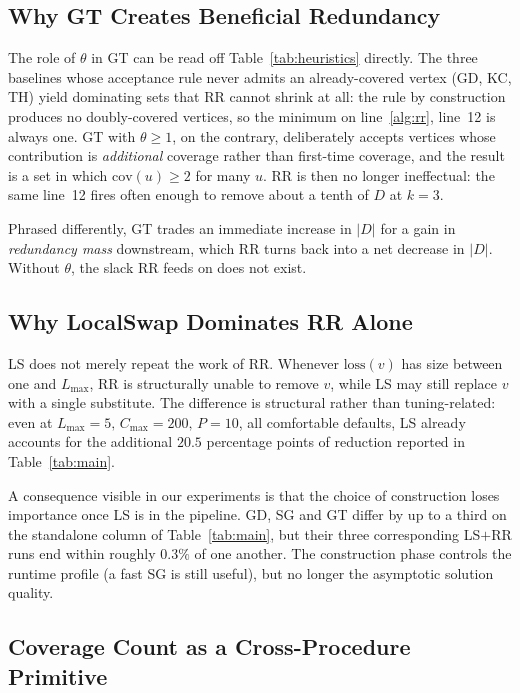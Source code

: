\documentclass[11pt,a4paper]{article}
\newcommand{\cov}{\mathrm{cov}}
\newcommand{\loss}{\mathrm{loss}}
\begin{document}
\subsection{Why GT Creates Beneficial Redundancy}

The role of $\theta$ in GT can be read off
Table~\ref{tab:heuristics} directly. The three baselines whose
acceptance rule never admits an already-covered vertex (GD, KC, TH)
yield dominating sets that RR cannot shrink at all: the rule by
construction produces no doubly-covered vertices, so the minimum on
line~\ref{alg:rr}, line~12 is always one. GT with $\theta\ge 1$, on
the contrary, deliberately accepts vertices whose contribution is
\emph{additional} coverage rather than first-time coverage, and the
result is a set in which $\cov(u)\ge 2$ for many $u$. RR is then no
longer ineffectual: the same line~12 fires often enough to remove
about a tenth of $D$ at $k=3$.

Phrased differently, GT trades an immediate increase in $|D|$ for a
gain in \emph{redundancy mass} downstream, which RR turns back into a
net decrease in $|D|$. Without $\theta$, the slack RR feeds on does
not exist.


\subsection{Why LocalSwap Dominates RR Alone}
\label{sec:discussion:why-ls}

LS does not merely repeat the work of RR. Whenever
$\loss(v)$ has size between one and $L_{\max}$, RR is structurally
unable to remove $v$, while LS may still replace $v$ with a single
substitute. The difference is structural rather than tuning-related:
even at $L_{\max}=5,\,C_{\max}=200,\,P=10$, all comfortable defaults,
LS already accounts for the additional $20.5$ percentage points of
reduction reported in Table~\ref{tab:main}.

A consequence visible in our experiments is that the choice of
construction loses importance once LS is in the pipeline. GD, SG and
GT differ by up to a third on the standalone column of
Table~\ref{tab:main}, but their three corresponding LS$+$RR runs end
within roughly $0.3\%$ of one another. The construction phase
controls the runtime profile (a fast SG is still useful), but no
longer the asymptotic solution quality.


\subsection{Coverage Count as a Cross-Procedure Primitive}
\end{document}
